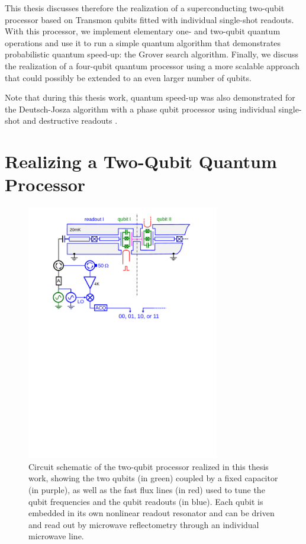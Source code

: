 \smallskip

This thesis discusses therefore the realization of
a superconducting two-qubit processor based on Transmon qubits fitted
with individual single-shot readouts. With this processor, we implement
elementary one- and two-qubit quantum operations and use it to run
a simple quantum algorithm that demonstrates probabilistic quantum
speed-up: the Grover search algorithm. Finally, we discuss the realization
of a four-qubit quantum processor using a more scalable approach that
could possibly be extended to an even larger number of qubits.

Note that during this thesis work, quantum speed-up
was also demonstrated for the Deutsch-Josza algorithm with a phase
qubit processor using individual single-shot and destructive readouts
\citep{yamamoto_quantum_2010}.


\section{Realizing a Two-Qubit Quantum Processor}

%
\begin{figure}[ht!]
 \centering \includegraphics[width=0.75\textwidth]{./material/papers/grover/figures/2_qubit_processor_schematic}
\caption[Circuit schematic of the realized two-qubit processor]{Circuit schematic of the two-qubit processor realized in this thesis work, showing the two qubits (in green) coupled by
a fixed capacitor (in purple), as well as the fast flux lines (in
red) used to tune the qubit frequencies and the qubit readouts (in
blue). Each qubit is embedded in its own nonlinear readout resonator
and can be driven and read out by microwave reflectometry through an individual microwave line.}


\label{fig:two_qubit_processor_schematic} %
\end{figure}


